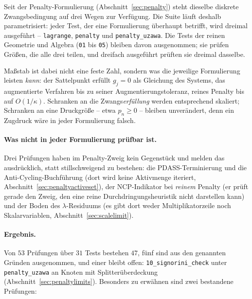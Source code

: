 \documentclass[a4paper,11pt]{article}
\def\tilde#1{#1}%
\newcommand{\code}[1]{\texttt{\small #1}}
\newcommand{\file}[1]{\texttt{\small #1}}
\begin{document}
Seit der Penalty-Formulierung (Abschnitt~\ref{sec:penalty}) steht dieselbe diskrete
Zwangsbedingung auf drei Wegen zur Verfügung. Die Suite läuft deshalb parametrisiert: jeder Test,
der eine Formulierung überhaupt betrifft, wird dreimal ausgeführt --
\code{lagrange}, \code{penalty} und \code{penalty\_uzawa}. Die Tests der reinen Geometrie und
Algebra (\file{01} bis \file{05}) bleiben davon ausgenommen; sie prüfen Größen, die alle drei
teilen, und dreifach ausgeführt prüften sie dreimal dasselbe.

Maßstab ist dabei nicht eine feste Zahl, sondern was die jeweilige Formulierung leisten
\emph{kann}: der Sattelpunkt erfüllt $\tilde g_j=0$ als Gleichung des Systems, das augmentierte
Verfahren bis zu seiner Augmentierungstoleranz, reines Penalty bis auf $O(1/\kappa)$. Schranken an
die Zwangs\emph{erfüllung} werden entsprechend skaliert; Schranken an eine Druckgröße --
etwa $p_n\ge0$ -- bleiben unverändert, denn ein Zugdruck wäre in jeder Formulierung falsch.

\paragraph{Was nicht in jeder Formulierung prüfbar ist.} Drei Prüfungen haben im Penalty-Zweig
kein Gegenstück und melden das ausdrücklich, statt stillschweigend zu bestehen: die
PDASS-Terminierung und die Anti-Cycling-Buchführung (dort wird keine Aktivmenge iteriert,
Abschnitt~\ref{sec:penaltyactiveset}), der NCP-Indikator bei \emph{reinem} Penalty (er prüft
gerade den Zweig, den eine reine Durchdringungsheuristik nicht darstellen kann) und der Boden des
$\lambda$-Residuums (es gibt dort weder Multiplikatorzeile noch Skalarvariablen,
Abschnitt~\ref{sec:scalelimit}).

\paragraph{Ergebnis.} Von $53$ Prüfungen über $31$ Tests bestehen $47$, fünf sind aus den
genannten Gründen ausgenommen, und einer bleibt offen: \file{10\_signorini\_check} unter
\code{penalty\_uzawa} an Knoten mit Splitterüberdeckung
(Abschnitt~\ref{sec:penaltylimits}). Besonders zu erwähnen sind zwei bestandene Prüfungen:
\end{document}
